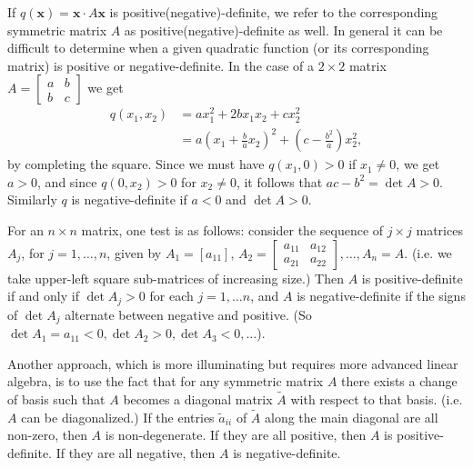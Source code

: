 \documentclass[12pt,letterpaper]{article}
\newcommand{\x}{\mathbf{x}}
\renewcommand{\a}{\mathbf{a}}
\begin{document}
If $q(\x) = \x\cdot A\x$ is positive(negative)-definite, we refer to the corresponding symmetric matrix $A$ as positive(negative)-definite as well. In general it can be difficult to determine when a given quadratic function (or its corresponding matrix) is positive or negative-definite. In the case of a $2\times 2$ matrix $A = \begin{bmatrix} a&b\\b&c\end{bmatrix}$ we get
\begin{align*}
q(x_1,x_2)&= ax_1^2+2bx_1x_2+cx_2^2\\
&=a\left(x_1+\frac{b}{a}x_2\right)^2+\left(c-\frac{b^2}{a}\right)x_2^2,
\end{align*}
by completing the square. Since we must have $q(x_1,0)>0$ if $x_1\neq 0$, we get $a>0$, and since $q(0,x_2)>0$ for $x_2\neq 0$, it follows that $ac-b^2=\det A >0$. Similarly $q$ is negative-definite if $a<0$ and $\det A>0$.

For an $n\times n$ matrix, one test is as follows: consider the sequence of $j\times j$ matrices $A_j$, for $j=1,\ldots , n$, given by  $A_1=[a_{11}]$, $A_2 = \begin{bmatrix} a_{11}&a_{12}\\a_{21}&a_{22}\end{bmatrix},\ldots, A_n=A$. (i.e. we take upper-left square sub-matrices of increasing size.) Then $A$ is positive-definite if and only if $\det A_j>0$ for each $j=1,\ldots n$, and $A$ is negative-definite if the signs of $\det A_j$ alternate between negative and positive. (So $\det A_1 = a_{11}<0, \det A_2>0, \det A_3<0,\ldots$).

Another approach, which is more illuminating but requires more advanced linear algebra, is to use the fact that for any symmetric matrix $A$ there exists a change of basis such that $A$ becomes a diagonal matrix $\tilde{A}$ with respect to that basis. (i.e. $A$ can be diagonalized.) If the entries $\tilde{a}_{ii}$ of $\tilde{A}$ along the main diagonal are all non-zero, then $A$ is non-degenerate. If they are all positive, then $A$ is positive-definite. If they are all negative, then $A$ is negative-definite.
\end{document}
